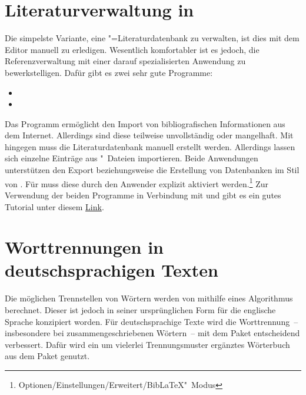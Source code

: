 \section{%
  Literaturverwaltung in %
}

%
Die simpelste Variante, eine "=Literaturdatenbank zu verwalten, 
ist dies mit dem Editor manuell zu erledigen. Wesentlich komfortabler ist es 
jedoch, die Referenzverwaltung mit einer darauf spezialisierten Anwendung zu 
bewerkstelligen. Dafür gibt es zwei sehr gute Programme:
%
\begin{itemize}
\item {}
\item {}
\end{itemize}
%
Das Programm  ermöglicht den Import von bibliografischen 
Informationen aus dem Internet. Allerdings sind diese teilweise unvollständig 
oder mangelhaft. Mit  hingegen muss die Literaturdatenbank 
manuell erstellt werden. Allerdings lassen sich einzelne Einträge aus 
"~Dateien importieren. Beide Anwendungen unterstützen den Export 
beziehungsweise die Erstellung von Datenbanken im Stil von . 
Für  muss diese durch den Anwender explizit aktiviert 
werden.\footnote{Optionen/Einstellungen/Erweitert/BibLaTeX"~Modus} 
Zur Verwendung der beiden Programme in Verbindung mit  und 
 gibt es ein gutes Tutorial unter diesem
\href{http://www.suedraum.de/latex/stammtisch/degenkolb_latex_biblatex_folien-final.pdf}{Link}.



\section{%
  Worttrennungen in deutschsprachigen Texten%
  \label{sec:tips:hyphenation}%
}

%
Die möglichen Trennstellen von Wörtern werden von  mithilfe 
eines Algorithmus berechnet. Dieser ist jedoch in seiner ursprünglichen Form 
für die englische Sprache konzipiert worden. Für deutschsprachige Texte wird 
die Worttrennung~-- insbesondere bei zusammengeschriebenen Wörtern~-- mit dem 
Paket  entscheidend verbessert. Dafür wird ein um vielerlei 
Trennungsmuster ergänztes Wörterbuch aus dem Paket  
genutzt. 

